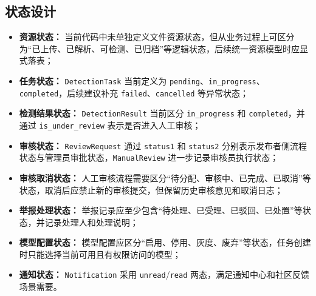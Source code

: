 \subsection{状态设计}
\begin{itemize}[leftmargin=2em]
    \item \textbf{资源状态：} 当前代码中未单独定义文件资源状态，但从业务过程上可区分为“已上传、已解析、可检测、已归档”等逻辑状态，后续统一资源模型时应显式落表；
    \item \textbf{任务状态：} \texttt{DetectionTask} 当前定义为 \texttt{pending}、\texttt{in\_progress}、\texttt{completed}，后续建议补充 \texttt{failed}、\texttt{cancelled} 等异常状态；
    \item \textbf{检测结果状态：} \texttt{DetectionResult} 当前区分 \texttt{in\_progress} 和 \texttt{completed}，并通过 \texttt{is\_under\_review} 表示是否进入人工审核；
    \item \textbf{审核状态：} \texttt{ReviewRequest} 通过 \texttt{status1} 和 \texttt{status2} 分别表示发布者侧流程状态与管理员审批状态，\texttt{ManualReview} 进一步记录审核员执行状态；
    \item \textbf{审核取消状态：} 人工审核流程需要区分“待分配、审核中、已完成、已取消”等状态，取消后应禁止新的审核提交，但保留历史审核意见和取消日志；
    \item \textbf{举报处理状态：} 举报记录应至少包含“待处理、已受理、已驳回、已处置”等状态，并记录处理人和处理说明；
    \item \textbf{模型配置状态：} 模型配置应区分“启用、停用、灰度、废弃”等状态，任务创建时只能选择当前可用且有权限访问的模型；
    \item \textbf{通知状态：} \texttt{Notification} 采用 \texttt{unread}/\texttt{read} 两态，满足通知中心和社区反馈场景需要。
\end{itemize}

